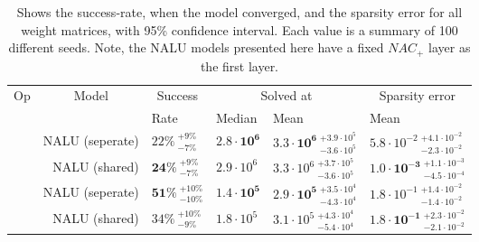 \begin{table}[!h]

\caption{\label{tab:simple-function-static-nalu-gate-table}Shows the success-rate, when the model converged, and the sparsity error for all weight matrices, with 95\% confidence interval. Each value is a summary of 100 different seeds. Note, the NALU models presented here have a fixed $NAC_{+}$ layer as the first layer.}
\centering
\begin{tabular}{crllll}
\toprule
\multicolumn{1}{c}{Op} & \multicolumn{1}{c}{Model} & \multicolumn{1}{c}{Success} & \multicolumn{2}{c}{Solved at} & \multicolumn{1}{c}{Sparsity error} \\
\cmidrule(l{3pt}r{3pt}){1-1} \cmidrule(l{3pt}r{3pt}){2-2} \cmidrule(l{3pt}r{3pt}){3-3} \cmidrule(l{3pt}r{3pt}){4-5} \cmidrule(l{3pt}r{3pt}){6-6}
 &  & Rate & Median & Mean & Mean\\
\midrule
 & NALU (seperate) & $22\% {~}^{+9\%}_{-7\%}$ & $\mathbf{2.8 \cdot 10^{6}}$ & $\mathbf{3.3 \cdot 10^{6}} {~}^{+3.9 \cdot 10^{5}}_{-3.6 \cdot 10^{5}}$ & $5.8 \cdot 10^{-2} {~}^{+4.1 \cdot 10^{-2}}_{-2.3 \cdot 10^{-2}}$\\

\nopagebreak
\multirow{-2}{*}{\centering\arraybackslash $\bm{\times}$} & NALU (shared) & $\mathbf{24\%} {~}^{+9\%}_{-7\%}$ & $2.9 \cdot 10^{6}$ & $3.3 \cdot 10^{6} {~}^{+3.7 \cdot 10^{5}}_{-3.6 \cdot 10^{5}}$ & $\mathbf{1.0 \cdot 10^{-3}} {~}^{+1.1 \cdot 10^{-3}}_{-4.5 \cdot 10^{-4}}$\\
\cmidrule{1-6}
 & NALU (seperate) & $\mathbf{51\%} {~}^{+10\%}_{-10\%}$ & $\mathbf{1.4 \cdot 10^{5}}$ & $\mathbf{2.9 \cdot 10^{5}} {~}^{+3.5 \cdot 10^{4}}_{-4.3 \cdot 10^{4}}$ & $1.8 \cdot 10^{-1} {~}^{+1.4 \cdot 10^{-2}}_{-1.4 \cdot 10^{-2}}$\\

\nopagebreak
\multirow{-2}{*}{\centering\arraybackslash $\bm{+}$} & NALU (shared) & $34\% {~}^{+10\%}_{-9\%}$ & $1.8 \cdot 10^{5}$ & $3.1 \cdot 10^{5} {~}^{+4.3 \cdot 10^{4}}_{-5.4 \cdot 10^{4}}$ & $\mathbf{1.8 \cdot 10^{-1}} {~}^{+2.3 \cdot 10^{-2}}_{-2.1 \cdot 10^{-2}}$\\
\bottomrule
\end{tabular}
\end{table}

